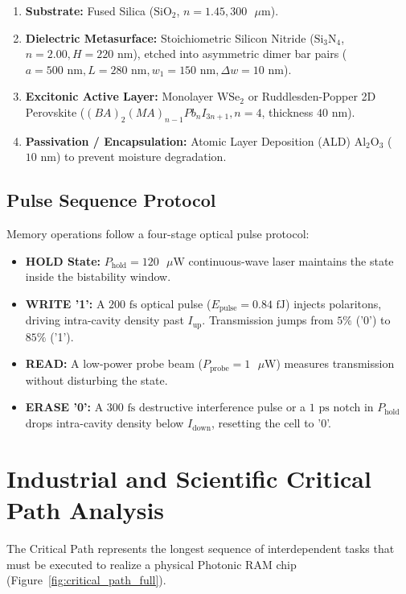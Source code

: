 \documentclass[11pt,a4paper]{article}
\begin{document}
\begin{enumerate}
    \item \textbf{Substrate:} Fused Silica ($\text{SiO}_2$, $n = 1.45, 300\text{ }\mu\text{m}$).
    \item \textbf{Dielectric Metasurface:} Stoichiometric Silicon Nitride ($\text{Si}_3\text{N}_4$, $n = 2.00, H = 220\text{ nm}$), etched into asymmetric dimer bar pairs ($a = 500\text{ nm}, L = 280\text{ nm}, w_1 = 150\text{ nm}, \Delta w = 10\text{ nm}$).
    \item \textbf{Excitonic Active Layer:} Monolayer $\text{WSe}_2$ or Ruddlesden-Popper 2D Perovskite ($(BA)_2(MA)_{n-1}Pb_n I_{3n+1}, n=4$, thickness $40\text{ nm}$).
    \item \textbf{Passivation / Encapsulation:} Atomic Layer Deposition (ALD) $\text{Al}_2\text{O}_3$ ($10\text{ nm}$) to prevent moisture degradation.
\end{enumerate}

\subsection{Pulse Sequence Protocol}
Memory operations follow a four-stage optical pulse protocol:
\begin{itemize}
    \item \textbf{HOLD State:} $P_{\text{hold}} = 120\text{ }\mu\text{W}$ continuous-wave laser maintains the state inside the bistability window.
    \item \textbf{WRITE '1':} A $200\text{ fs}$ optical pulse ($E_{\text{pulse}} = 0.84\text{ fJ}$) injects polaritons, driving intra-cavity density past $I_{\text{up}}$. Transmission jumps from $5\%$ ('0') to $85\%$ ('1').
    \item \textbf{READ:} A low-power probe beam ($P_{\text{probe}} = 1\text{ }\mu\text{W}$) measures transmission without disturbing the state.
    \item \textbf{ERASE '0':} A $300\text{ fs}$ destructive interference pulse or a $1\text{ ps}$ notch in $P_{\text{hold}}$ drops intra-cavity density below $I_{\text{down}}$, resetting the cell to '0'.
\end{itemize}

\section{Industrial and Scientific Critical Path Analysis}

The Critical Path represents the longest sequence of interdependent tasks that must be executed to realize a physical Photonic RAM chip (Figure~\ref{fig:critical_path_full}).
\end{document}

